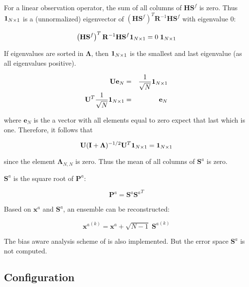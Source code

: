 \documentclass[a4paper,12pt]{article}
\newcommand{\mat}{\mathbf}
\renewcommand{\vec}{\mathbf}
\begin{document}
{%
For a linear observation operator, the sum of all columns of $\mat H \mat S^f$ is zero. Thus $\mathbf 1_{N \times 1}$ is a (unnormalized) eigenvector of $\left(\mathbf H \mathbf S^f\right)^T  \mathbf R^{-1} \mathbf H \mathbf S^f$ with eigenvalue 0:


\begin{equation}
\left(\mathbf H \mathbf S^f\right)^T  \mathbf R^{-1} \mathbf H \mathbf S^f
\mathbf 1_{N \times 1} 
= 
0 \;
\mathbf 1_{N \times 1}
\end{equation}

If eigenvalues are sorted in $\mat \Lambda$, then $\mathbf 1_{N \times 1}$ is the smallest and last eigenvalue (as all eigenvalues positive).


\begin{eqnarray}
  \mat U \vec e_N &=& \frac{1}{\sqrt{N}} \one \\
  \mat U^T \frac{1}{\sqrt{N}} \one &=& \vec e_N
\end{eqnarray}

where $\vec e_N$ is the a vector with all elements equal to zero expect that last which is one. Therefore, it follows that

\begin{equation}
  \mathbf U (\mathbf I + \mathbf \Lambda)^{-1/2} \mathbf U^T \mathbf 1_{N \times 1} = \mathbf 1_{N \times 1}
\end{equation}

since the element $\mat \Lambda_{N,N}$ is zero. Thus the mean of all columns of $\mat S^a$ is zero.
}
 
$\mathbf S^a$ is the square root of $\mathbf P^a$:

\begin{equation}
\mathbf P^a = \mathbf S^a {\mathbf S^a}^T
\end{equation}

Based on $\mathbf x^a$ and $\mathbf S^a$, an ensemble can be reconstructed:

\begin{equation}
{\mathbf x^a}^{(k)} = \mathbf x^a + {\sqrt{N-1}} \; {\mathbf S^a}^{(k)}
\end{equation}

The bias aware analysis scheme of \citet{dee98} is also implemented. But the error space $\mathbf S^a$ is not computed.

\subsection{Configuration}\label{sec_config}
\end{document}
